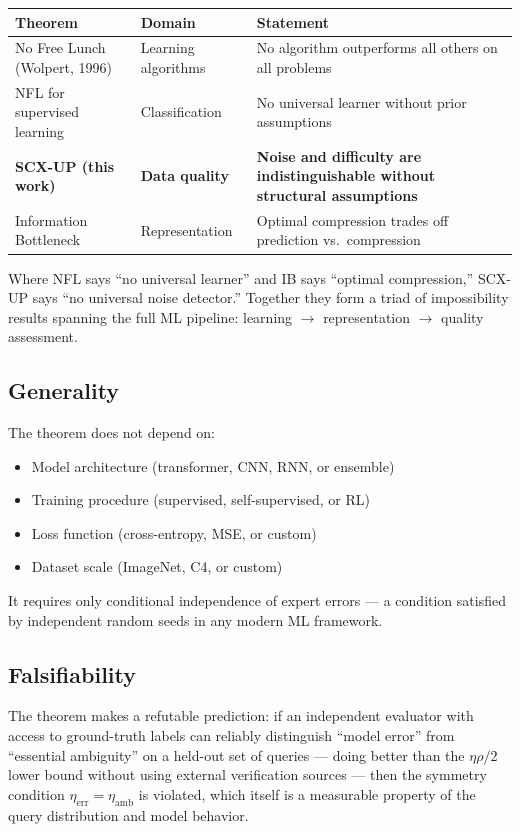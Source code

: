 \documentclass[12pt,a4paper]{ctexart}
\theoremstyle{definition}
\theoremstyle{remark}
\begin{document}
\begin{table}[htbp]
\centering
\begin{tabular}{@{}lll@{}}
\toprule
Theorem & Domain & Statement \\
\midrule
No Free Lunch (Wolpert, 1996) & Learning algorithms & No algorithm outperforms all others on all problems \\
NFL for supervised learning & Classification & No universal learner without prior assumptions \\
\textbf{SCX-UP (this work)} & \textbf{Data quality} & \textbf{Noise and difficulty are indistinguishable without structural assumptions} \\
Information Bottleneck & Representation & Optimal compression trades off prediction vs.\ compression \\
\bottomrule
\end{tabular}
\end{table}

Where NFL says ``no universal learner'' and IB says ``optimal compression,'' SCX-UP says ``no universal noise detector.'' Together they form a triad of impossibility results spanning the full ML pipeline: learning $\to$ representation $\to$ quality assessment.

\subsection{Generality}

The theorem does not depend on:
\begin{itemize}
\item Model architecture (transformer, CNN, RNN, or ensemble)
\item Training procedure (supervised, self-supervised, or RL)
\item Loss function (cross-entropy, MSE, or custom)
\item Dataset scale (ImageNet, C4, or custom)
\end{itemize}

It requires only conditional independence of expert errors — a condition satisfied by independent random seeds in any modern ML framework.

\subsection{Falsifiability}

The theorem makes a refutable prediction: if an independent evaluator with access to ground-truth labels can reliably distinguish ``model error'' from ``essential ambiguity'' on a held-out set of queries — doing better than the $\eta\rho/2$ lower bound without using external verification sources — then the symmetry condition $\eta_{\text{err}} = \eta_{\text{amb}}$ is violated, which itself is a measurable property of the query distribution and model behavior.
\end{document}
